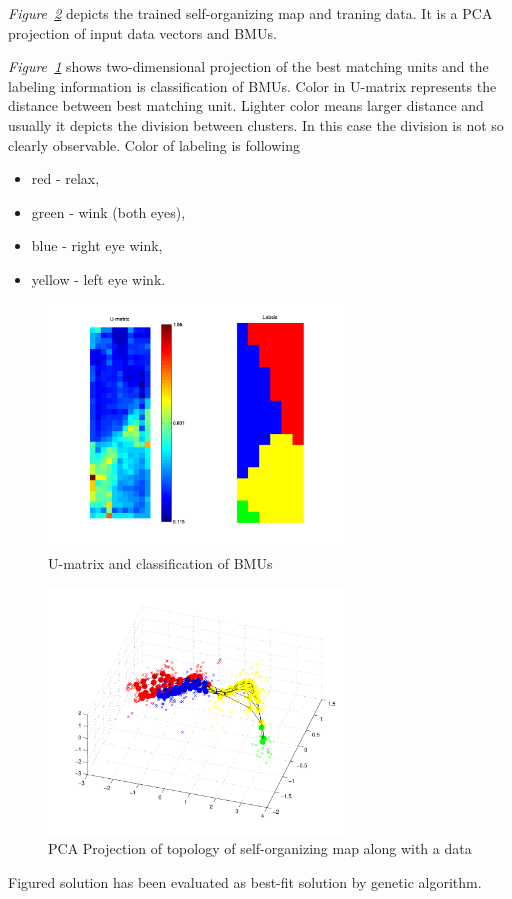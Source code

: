 \documentclass[a4paper,jurnal]{IEEEtran}
\begin{document}
\textit{Figure~\ref{fig:som_topol_proj}} depicts the trained self-organizing map and traning data.
It is a PCA projection of input data vectors and BMUs.

\textit{Figure~\ref{fig:som_umat}} shows two-dimensional projection of the best matching units and
the labeling information is classification of BMUs. 
Color in U-matrix represents the distance between best matching unit. Lighter color
means larger distance and usually it depicts the division between clusters. In this case
the division is not so clearly observable. Color of labeling is following
\begin{itemize}
	\item  red - relax,
	\item green - wink (both eyes),
	\item blue - right eye wink,
	\item yellow - left eye wink.
\end{itemize}

\begin{figure}[h]
	\centering
	\includegraphics[width=80mm]{som_umat}
	\caption{U-matrix and classification of BMUs}
	\label{fig:som_umat}
\end{figure}
\begin{figure}[h]
	\centering
	\includegraphics[width=80mm]{som_topol_proj}
	\caption{PCA Projection of topology of self-organizing map along with a data}
	\label{fig:som_topol_proj}
\end{figure}
Figured solution has been evaluated as best-fit solution by genetic algorithm.
\end{document}
